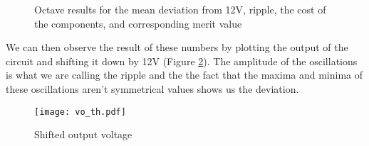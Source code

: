 \begin{figure}[h]
	\centering
	\scalebox{1.2}{
		
	}
	\caption{Octave results for the mean deviation from 12V, ripple, the cost of the components, and corresponding merit value}
	\label{fig:th_results}
\end{figure}

We can then observe the result of these numbers by plotting the output of the circuit and shifting it down by 12V (Figure \ref{fig:th_vo}). The amplitude of the oscillations is what we are calling the ripple and the the fact that the maxima and minima of these oscillations aren't symmetrical values shows us the deviation.


\begin{figure}[h]
	\centering
	\texttt{[image: vo\_th.pdf]}
	\caption{Shifted output voltage}
	\label{fig:th_vo}
\end{figure}
\goodbreak

